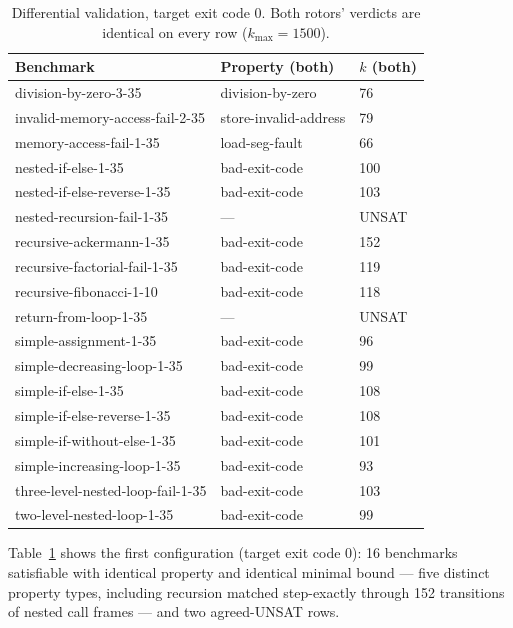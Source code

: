 \documentclass[sigplan,screen,nonacm]{acmart}
\begin{document}
\begin{table}[t]
\caption{Differential validation, target exit code 0. Both rotors'
verdicts are identical on every row ($k_{\max}{=}1500$).}
\label{tab:equiv}
\centering
\footnotesize
\begin{tabular}{lll}
\toprule
Benchmark & Property (both) & $k$ (both) \\
\midrule
division-by-zero-3-35 & division-by-zero & 76 \\
invalid-memory-access-fail-2-35 & store-invalid-address & 79 \\
memory-access-fail-1-35 & load-seg-fault & 66 \\
nested-if-else-1-35 & bad-exit-code & 100 \\
nested-if-else-reverse-1-35 & bad-exit-code & 103 \\
nested-recursion-fail-1-35 & --- & UNSAT \\
recursive-ackermann-1-35 & bad-exit-code & 152 \\
recursive-factorial-fail-1-35 & bad-exit-code & 119 \\
recursive-fibonacci-1-10 & bad-exit-code & 118 \\
return-from-loop-1-35 & --- & UNSAT \\
simple-assignment-1-35 & bad-exit-code & 96 \\
simple-decreasing-loop-1-35 & bad-exit-code & 99 \\
simple-if-else-1-35 & bad-exit-code & 108 \\
simple-if-else-reverse-1-35 & bad-exit-code & 108 \\
simple-if-without-else-1-35 & bad-exit-code & 101 \\
simple-increasing-loop-1-35 & bad-exit-code & 93 \\
three-level-nested-loop-fail-1-35 & bad-exit-code & 103 \\
two-level-nested-loop-1-35 & bad-exit-code & 99 \\
\bottomrule
\end{tabular}
\end{table}

Table~\ref{tab:equiv} shows the first configuration (target exit code
0): 16 benchmarks satisfiable with identical property and identical
minimal bound --- five distinct property types, including recursion
matched step-exactly through 152 transitions of nested call frames ---
and two agreed-UNSAT rows.
\end{document}
